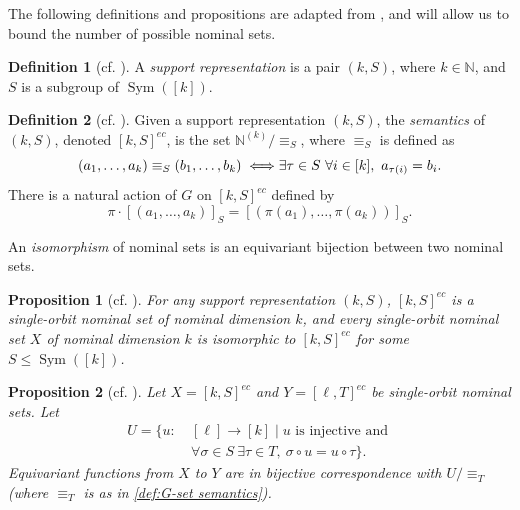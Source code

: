 \documentclass[11pt,a4paper]{amsart}
\newtheorem{proposition}{Proposition}
\theoremstyle{definition}
\newtheorem{definition}{Definition}
\newcommand{\bb}{\mathbb}
\DeclareMathOperator{\Sym}{Sym}
\begin{document}
The following definitions and propositions are adapted from \cite[Section 9]{bojanczyk-klin-lasota:automata-theory-in-nominal-sets}, and will allow us to bound the number of possible nominal sets.

\begin{definition}[{cf. \cite[Definition 9.11]{bojanczyk-klin-lasota:automata-theory-in-nominal-sets}}]
    A \emph{support representation} is a pair $(k,S)$, where $k \in \bb N$, and $S$ is a subgroup of $\Sym([k])$. 
\end{definition}

\begin{definition}[{cf. \cite[Definition 9.14]{bojanczyk-klin-lasota:automata-theory-in-nominal-sets}}] \label{def:G-set semantics}
    Given a support representation $(k,S)$, the \emph{semantics} of $(k,S)$, denoted $[k,S]^{ec}$, is the set $\bb N^{(k)} / \equiv_S$, where $\equiv_S$ is defined as
    \[
    (a_1, \ldots, a_k) \equiv_S (b_1, \ldots, b_k) \iff \\ \exists \tau \in S \ \forall i \in [k], \ a_{\tau(i)} = b_i .
    \]
    There is a natural action of $G$ on $[k,S]^{ec}$ defined by 
    \[
    \pi \cdot [(a_1, \ldots, a_k)]_S = [(\pi(a_1), \ldots, \pi(a_k))]_S.
    \]
\end{definition}

An \emph{isomorphism} of nominal sets is an equivariant bijection between two nominal sets.

\begin{proposition}[{cf. \cite[Proposition 9.15]{bojanczyk-klin-lasota:automata-theory-in-nominal-sets}}] \label{prop:characterization of single-orbit nominal sets}
    For any support representation $(k,S)$, $[k,S]^{ec}$ is a single-orbit nominal set of nominal dimension $k$, and every single-orbit nominal set $X$ of nominal dimension $k$ is isomorphic to $[k,S]^{ec}$ for some $S \leq \Sym([k])$. 
\end{proposition}

\begin{proposition}[{cf. \cite[Proposition 9.16]{bojanczyk-klin-lasota:automata-theory-in-nominal-sets}}] \label{prop:characterization of equivariant functions}
    Let $X = [k,S]^{ec}$ and $Y = [\ell,T]^{ec}$ be single-orbit nominal sets. 
    Let 
    \begin{align*}
        U = \{u : \ &[\ell] \to [k] \mid u \text{ is injective and } \\ 
        &\forall \sigma \in S  \ \exists \tau \in T, \ \sigma \circ u = u \circ \tau\}.
    \end{align*}
    Equivariant functions from $X$ to $Y$ are in bijective correspondence with $U / \equiv_T$ (where $\equiv_T$ is as in \autoref{def:G-set semantics}).
\end{proposition}
\end{document}
